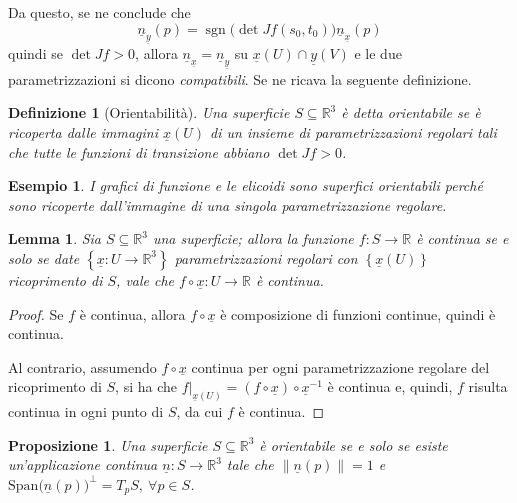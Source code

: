 \documentclass[12pt]{scrartcl}
\theoremstyle{style}
\newtheorem{esempio}{Esempio}[section]
\newtheorem{definizione}{Definizione}[section]
\newtheorem{prop}{Proposizione}[section]
\newtheorem{lemma}{Lemma}[teorema]
\numberwithin{equation}{subsection}
\begin{document}
Da questo, se ne conclude che 
\begin{equation}
	\underline{n}_{\underline{y}} (p) = \operatorname{sgn} \big(\det Jf(s_0,t_0)\big) \underline{n}_{\underline{x}} (p)
\end{equation}
quindi se $\det Jf > 0$, allora $\underline{n}_{\underline{x}} = \underline{n}_{\underline{y}} $ su $\underline{x}(U) \cap \underline{y}(V)$ e le due parametrizzazioni si dicono \textit{compatibili}.
Se ne ricava la seguente definizione.
\begin{definizione}
	[Orientabilit\`a] Una superficie $S \subseteq \mathbb{R}^3$ \`e detta \textit{orientabile} se \`e ricoperta dalle immagini $\underline{x}(U)$ di un insieme di parametrizzazioni regolari tali che tutte le funzioni di transizione abbiano $\det Jf > 0$.
\end{definizione}
\begin{esempio}
I grafici di funzione e le elicoidi sono superfici orientabili perch\'e sono ricoperte dall'immagine di una singola parametrizzazione regolare.
\end{esempio}
\begin{lemma}
	Sia $S \subseteq \mathbb{R}^3$ una superficie; allora la funzione $f : S \to \mathbb{R}$ \`e continua se e solo se date $\left\{ \underline{x}:U\to\mathbb{R}^3 \right\} $ parametrizzazioni regolari con $\left\{ \underline{x}(U) \right\} $ ricoprimento di $S$, vale che $f\circ \underline{x}: U \to \mathbb{R}$ \`e continua.
\end{lemma}
\begin{proof}
	Se $f$ \`e continua, allora $f\circ \underline{x}$ \`e composizione di funzioni continue, quindi \`e continua.

	Al contrario, assumendo $f\circ \underline{x} $ continua per ogni parametrizzazione regolare del ricoprimento di $S$, si ha che $f |_{\underline{x}(U)} = (f\circ \underline{x}) \circ \underline{x}^{-1}$ \`e continua e, quindi, $f$ risulta continua in ogni punto di $S$, da cui $f$ \`e continua.
\end{proof}
\begin{prop}
	Una superficie $S \subseteq \mathbb{R}^3$ \`e orientabile se e solo se esiste un'applicazione continua $\underline{n} : S \to \mathbb{R}^3$ tale che $\left\lVert \underline{n}(p) \right\rVert =1 $ e $\mathrm{Span} \big(\underline{n}(p)\big)^\perp = T_pS, \ \forall p \in S$.
\end{prop}
\end{document}
